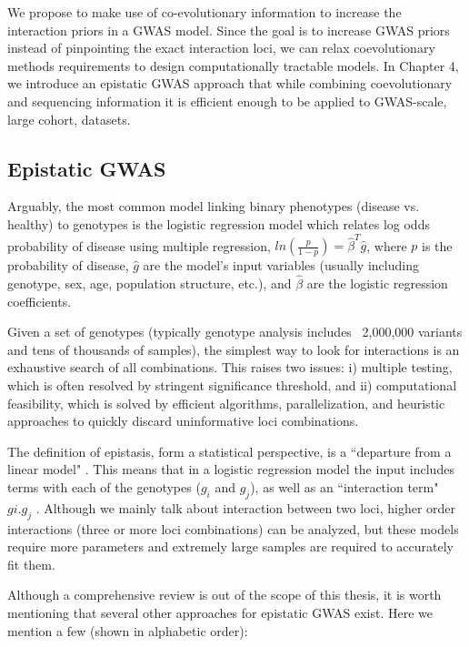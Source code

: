 We propose to make use of co-evolutionary information to increase the interaction priors in a GWAS model. Since the goal is to increase GWAS priors instead of pinpointing the exact interaction loci, we can relax coevolutionary methods requirements to design computationally tractable models. In Chapter 4, we introduce an epistatic GWAS approach that while combining coevolutionary and sequencing information it is efficient enough to be applied to GWAS-scale, large cohort, datasets.

\subsection{Epistatic GWAS \label{sec:epigwas}}

Arguably, the most common model linking binary phenotypes (disease vs. healthy) to genotypes is the logistic regression model which relates log odds probability of disease using multiple regression, $ln(\frac{p}{1-p}) = \hat{\beta}^T \hat{g}$, where $p$ is the probability of disease, $\hat{g}$ are the model’s input variables (usually including genotype, sex, age, population structure, etc.), and $\hat{\beta}$ are the logistic regression coefficients. 

Given a set of genotypes (typically genotype analysis includes ~2,000,000 variants and tens of thousands of samples), the simplest way to look for interactions is an exhaustive search of all combinations. This raises two issues: i) multiple testing, which is often resolved by stringent significance threshold, and ii) computational feasibility, which is solved by efficient algorithms, parallelization, and heuristic approaches to quickly discard uninformative loci combinations.

The definition of epistasis, form a statistical perspective, is a ``departure from a linear model" \cite{cordell2009detecting}. This means that in a logistic regression model the input includes terms with each of the genotypes ($g_i$ and $g_j$), as well as an ``interaction term" $gi . g_j$ \cite{cordell2002epistasis}. Although we mainly talk about interaction between two loci, higher order interactions (three or more loci combinations) can be analyzed, but these models require more parameters and extremely large samples are required to accurately fit them.

Although a comprehensive review is out of the scope of this thesis, it is worth mentioning that several other approaches for epistatic GWAS exist. Here we mention a few (shown in alphabetic order):

